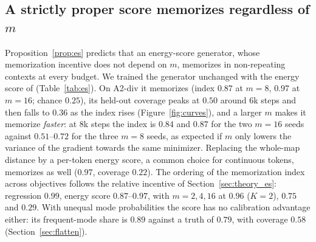 \subsection{A strictly proper score memorizes regardless of $m$}
\label{sec:es}
Proposition~\ref{prop:es} predicts that an energy-score generator, whose memorization incentive does not depend on $m$, memorizes in non-repeating contexts at every budget. We trained the \imlewm{} generator unchanged with the energy score of \citet{makabe2026esp} (Table~\ref{tab:es}). On A2-div it memorizes (index $0.87$ at $m{=}8$, $0.97$ at $m{=}16$; chance $0.25$), its held-out coverage peaks at $0.50$ around 6k steps and then falls to $0.36$ as the index rises (Figure~\ref{fig:curves}), and a larger $m$ makes it memorize \emph{faster}: at 8k steps the index is $0.84$ and $0.87$ for the two $m{=}16$ seeds against $0.51$--$0.72$ for the three $m{=}8$ seeds, as expected if $m$ only lowers the variance of the gradient towards the same minimizer. Replacing the whole-map distance by a per-token energy score, a common choice for continuous tokens, memorizes as well ($0.97$, coverage $0.22$). The ordering of the memorization index across objectives follows the relative incentive of Section~\ref{sec:theory_es}: regression $0.99$, energy score $0.87$--$0.97$, \nom{} with $m = 2, 4, 16$ at $0.96$ ($K{=}2$), $0.75$ and $0.29$. With unequal mode probabilities the score has no calibration advantage either: its frequent-mode share is $0.89$ against a truth of $0.79$, with coverage $0.58$ (Section~\ref{sec:flatten}).

